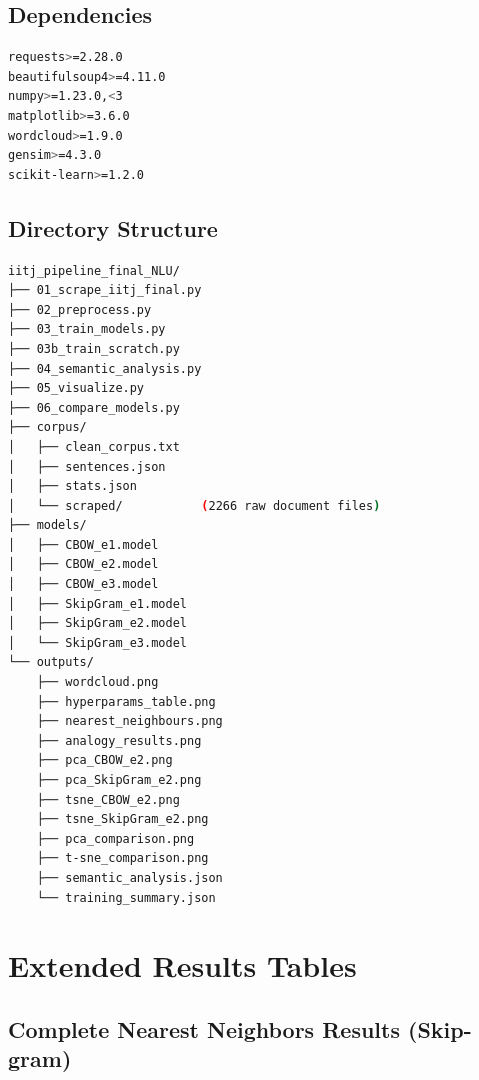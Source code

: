 \documentclass[11pt,a4paper]{report}
\begin{document}
\section{Dependencies}

\begin{lstlisting}[language=bash,caption=Python Dependencies (requirements.txt)]
requests>=2.28.0
beautifulsoup4>=4.11.0
numpy>=1.23.0,<3
matplotlib>=3.6.0
wordcloud>=1.9.0
gensim>=4.3.0
scikit-learn>=1.2.0
\end{lstlisting}

\section{Directory Structure}

\begin{lstlisting}[language=bash,caption=Project Directory Layout]
iitj_pipeline_final_NLU/
├── 01_scrape_iitj_final.py
├── 02_preprocess.py
├── 03_train_models.py
├── 03b_train_scratch.py
├── 04_semantic_analysis.py
├── 05_visualize.py
├── 06_compare_models.py
├── corpus/
│   ├── clean_corpus.txt
│   ├── sentences.json
│   ├── stats.json
│   └── scraped/           (2266 raw document files)
├── models/
│   ├── CBOW_e1.model
│   ├── CBOW_e2.model
│   ├── CBOW_e3.model
│   ├── SkipGram_e1.model
│   ├── SkipGram_e2.model
│   └── SkipGram_e3.model
└── outputs/
    ├── wordcloud.png
    ├── hyperparams_table.png
    ├── nearest_neighbours.png
    ├── analogy_results.png
    ├── pca_CBOW_e2.png
    ├── pca_SkipGram_e2.png
    ├── tsne_CBOW_e2.png
    ├── tsne_SkipGram_e2.png
    ├── pca_comparison.png
    ├── t-sne_comparison.png
    ├── semantic_analysis.json
    └── training_summary.json
\end{lstlisting}

\chapter{Extended Results Tables}

\section{Complete Nearest Neighbors Results (Skip-gram)}
\end{document}
